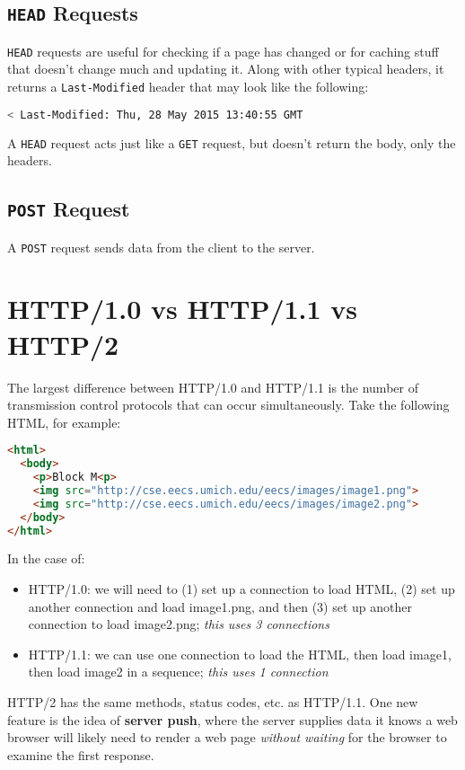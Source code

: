 \subsection{\texttt{HEAD} Requests}
\texttt{HEAD} requests are useful for checking if a page has changed or for caching stuff that doesn't change much and updating it. Along with other typical headers, it returns a \texttt{Last-Modified} header that may look like the following:
\begin{lstlisting}[language=bash]
< Last-Modified: Thu, 28 May 2015 13:40:55 GMT	
\end{lstlisting}

\begin{definition}
	A \texttt{HEAD} request acts just like a \texttt{GET} request, but doesn't return the body, only the headers.
\end{definition}

\subsection{\texttt{POST} Request}
\begin{definition}
	A \texttt{POST} request sends data from the client to the server.
\end{definition}

\section{HTTP/1.0 vs HTTP/1.1 vs HTTP/2}
The largest difference between HTTP/1.0 and HTTP/1.1 is the number of transmission control protocols that can occur simultaneously. Take the following HTML, for example:
\begin{lstlisting}[language=HTML]
<html>
  <body>
    <p>Block M<p>
    <img src="http://cse.eecs.umich.edu/eecs/images/image1.png">
    <img src="http://cse.eecs.umich.edu/eecs/images/image2.png">
  </body>
</html>	
\end{lstlisting}

In the case of:
\begin{itemize}
	\item HTTP/1.0: we will need to (1) set up a connection to load HTML, (2) set up another connection and load image1.png, and then (3) set up another connection to load image2.png; \emph{this uses 3 connections}
	\item HTTP/1.1: we can use one connection to load the HTML, then load image1, then load image2 in a sequence; \emph{this uses 1 connection} 
\end{itemize}

HTTP/2 has the same methods, status codes, etc. as HTTP/1.1. One new feature is the idea of \textbf{server push}, where the server supplies data it knows a web browser will likely need to render a web page \emph{without waiting} for the browser to examine the first response.